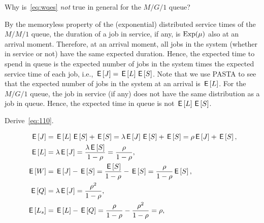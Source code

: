 \begin{exercise}\label{ex:l-216}
Why is~\cref{eq:wqes} \emph{not} true in general for the $M/G/1$ queue? 
\begin{solution}
 By the memoryless property of the (exponential) distributed service times of the $M/M/1$ queue, the duration of a job in service, if any, is $\operatorname{Exp}(\mu)$ also at an arrival moment.
 Therefore, at an arrival moment, all jobs in the system (whether in service or not) have the same expected duration.
 Hence, the expected time to spend in queue is the expected number of jobs in the system times the expected service time of each job, i.e., $\,\mathsf{E}\left[J\right] = \,\mathsf{E}\left[L\right] \,\mathsf{E}\left[S\right]$.
 Note that we use PASTA to see that the expected number of jobs in the system at an arrival is $\,\mathsf{E}\left[L\right]$.
 For the $M/G/1$ queue, the job in service (if any) does not have the same distribution as a job in queue.
 Hence, the expected time in queue is not $\,\mathsf{E}\left[L\right] \,\mathsf{E}\left[S\right]$.
\end{solution}
\end{exercise}

\begin{exercise}\label{ex:l-215}
Derive~\cref{eq:110}.
\begin{solution}
\begin{align*}
 \,\mathsf{E}\left[J\right] &= \,\mathsf{E}\left[L\right] \,\mathsf{E}\left[S\right] + \,\mathsf{E}\left[S\right] = \lambda \,\mathsf{E}\left[J\right] \,\mathsf{E}\left[S\right] + \,\mathsf{E}\left[S\right]= \rho \,\mathsf{E}\left[J\right] + \,\mathsf{E}\left[S\right], \\
 \,\mathsf{E}\left[L\right] &= \lambda \,\mathsf{E}\left[J\right] = \frac{\lambda \,\mathsf{E}\left[S\right]}{1-\rho} = \frac\rho{1-\rho}, \\
 \,\mathsf{E}\left[W\right] &= \,\mathsf{E}\left[J\right] - \,\mathsf{E}\left[S\right] = \frac{\,\mathsf{E}\left[S\right]}{1-\rho} - \,\mathsf{E}\left[S\right] = \frac{\rho}{1-\rho} \,\mathsf{E}\left[S\right],\\
 \,\mathsf{E}\left[Q\right] &= \lambda \,\mathsf{E}\left[J\right] = \frac{\rho^2}{1-\rho}, \\
 \,\mathsf{E}\left[L_s\right] &= \,\mathsf{E}\left[L\right] - \,\mathsf{E}\left[Q\right] = \frac{\rho}{1-\rho} - \frac{\rho^2}{1-\rho} = \rho, 
\end{align*}
\end{solution}
\end{exercise}



